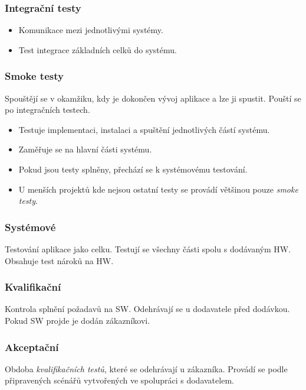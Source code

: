     \subsubsection{Integrační testy}
      \begin{itemize}
        \item Komunikace mezi jednotlivými systémy.
        \item Test integrace základních celků do systému.
      \end{itemize}

    \subsubsection{Smoke testy}
      Spouštějí se v okamžiku, kdy je dokončen vývoj aplikace a lze ji spustit. Pouští se po integračních testech.

      \begin{itemize}
        \item Testuje implementaci, instalaci a spuštění jednotlivých částí systému.
        \item Zaměřuje se na hlavní části systému.
        \item Pokud jsou testy splněny, přechází se k systémovému testování.
        \item U menších projektů kde nejsou ostatní testy se provádí většinou pouze \emph{smoke testy}.
      \end{itemize}

    \subsubsection{Systémové}
      Testování aplikace jako celku. Testují se všechny části spolu s dodávaným HW. Obsahuje test nároků na HW.

    \subsubsection{Kvalifikační}
      Kontrola splnění požadavů na SW. Odehrávají se u dodavatele před dodávkou. Pokud SW projde
      je dodán zákazníkovi.

    \subsubsection{Akceptační}
      Obdoba \emph{kvalifikačních testů}, které se odehrávají u zákazníka. Provádí se podle připravených scénářů vytvořených
      ve spolupráci s dodavatelem.

